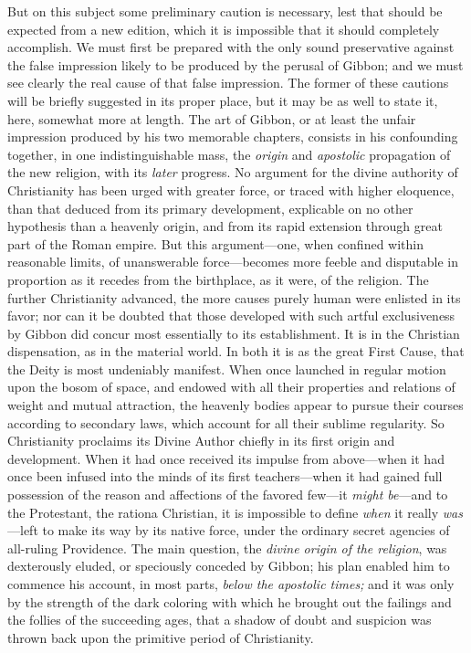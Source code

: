 But on this subject some preliminary caution is necessary, lest that should
be expected from a new edition, which it is impossible that it should completely
accomplish. We must first be prepared with the only sound preservative
against the false impression likely to be produced by the perusal of Gibbon;
and we must see clearly the real cause of that false impression. The former
of these cautions will be briefly suggested in its proper place, but it may
be as well to state it, here, somewhat more at length. The art of Gibbon, or
at least the unfair impression produced by his two memorable chapters,
consists in his confounding together, in one indistinguishable mass, the
\textit{origin} and \textit{apostolic} propagation of the new religion, with
its \textit{later} progress. No argument for the divine authority of
Christianity has been urged with greater force, or traced with higher eloquence,
than that deduced from its primary development, explicable on no other
hypothesis than a heavenly origin, and from its rapid extension through great
part of the Roman empire. But this argument—one, when confined within
reasonable limits, of unanswerable force—becomes more feeble and disputable
in proportion as it recedes from the birthplace, as it were, of the religion.
The further Christianity advanced, the more causes purely human were enlisted
in its favor; nor can it be doubted that those developed with such artful
exclusiveness by Gibbon did concur most essentially to its establishment.
It is in the Christian dispensation, as in the material world. In both it is
as the great First Cause, that the Deity is most undeniably manifest. When
once launched in regular motion upon the bosom of space, and endowed with
all their properties and relations of weight and mutual attraction, the
heavenly bodies appear to pursue their courses according to secondary laws,
which account for all their sublime regularity. So Christianity proclaims its
Divine Author chiefly in its first origin and development. When it had once
received its impulse from above—when it had once been infused into the minds
of its first teachers—when it had gained full possession of the reason and
affections of the favored few—it \textit{might be}—and to the Protestant,
the rationa Christian, it is impossible to define \textit{when} it really
\textit{was}—left to make its way by its native force, under the ordinary
secret agencies of all-ruling Providence. The main question, the \textit{divine
origin of the religion}, was dexterously eluded, or speciously conceded by
Gibbon; his plan enabled him to commence his account, in most parts, \textit{below
the apostolic times;} and it was only by the strength of the dark coloring
with which he brought out the failings and the follies of the succeeding ages,
that a shadow of doubt and suspicion was thrown back upon the primitive
period of Christianity.

